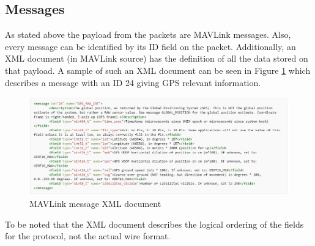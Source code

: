 \subsection{Messages}
As stated above the payload from the packets are MAVLink messages. Also, every message can be identified by its ID field on the packet. Additionally, an XML document (in MAVLink source) has the definition of all the data stored on that payload. A sample of such an XML document can be seen in Figure \ref{fig:mav_msg} which describes a message with an ID 24 giving GPS relevant information.

\begin{figure}[h]
	\centering
	\includegraphics[scale=0.5]{figures/mavlink_msg.jpg}
	\caption{MAVLink message XML document}
	\label{fig:mav_msg}
\end{figure}

To be noted that the XML document describes the logical ordering of the fields for the protocol, not the actual wire format.